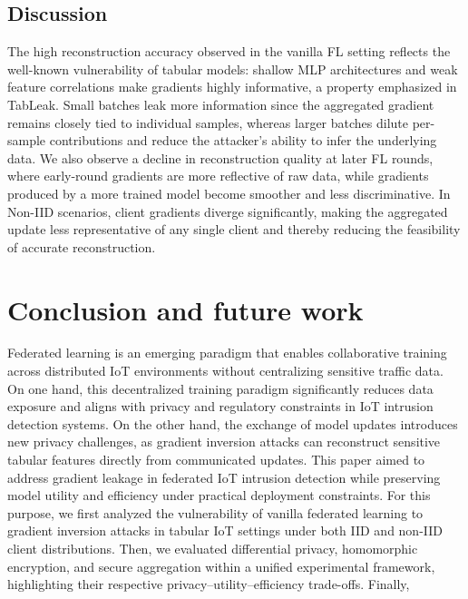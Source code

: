 \documentclass[journal,twoside,web]{ieeecolor}
\begin{document}
\subsection{Discussion}

The high reconstruction accuracy observed in the vanilla FL setting reflects the well-known vulnerability of tabular models: shallow MLP architectures and weak feature correlations make gradients highly informative, a property emphasized in TabLeak. Small batches leak more information since the aggregated gradient remains closely tied to individual samples, whereas larger batches dilute per-sample contributions and reduce the attacker’s ability to infer the underlying data.
 We also observe a decline in reconstruction quality at later FL rounds, where early-round gradients are more reflective of raw data, while gradients produced by a more trained model become smoother and less discriminative. In Non-IID scenarios, client gradients diverge significantly, making the aggregated update less representative of any single client and thereby reducing the feasibility of accurate reconstruction. 










\section{Conclusion and future work}
\label{sec:conclusion}

Federated learning is an emerging paradigm that enables collaborative training across distributed IoT environments without centralizing sensitive traffic data. On one hand, this decentralized training paradigm significantly reduces data exposure and aligns with privacy and regulatory constraints in IoT intrusion detection systems. On the other hand, the exchange of model updates introduces new privacy challenges, as gradient inversion attacks can reconstruct sensitive tabular features directly from communicated updates. This paper aimed to address gradient leakage in federated IoT intrusion detection while preserving model utility and efficiency under practical deployment constraints. For this purpose, we first analyzed the vulnerability of vanilla federated learning to gradient inversion attacks in tabular IoT settings under both IID and non-IID client distributions. Then, we evaluated differential privacy, homomorphic encryption, and secure aggregation within a unified experimental framework, highlighting their respective privacy–utility–efficiency trade-offs. Finally,

\printbibliography
\end{document}
